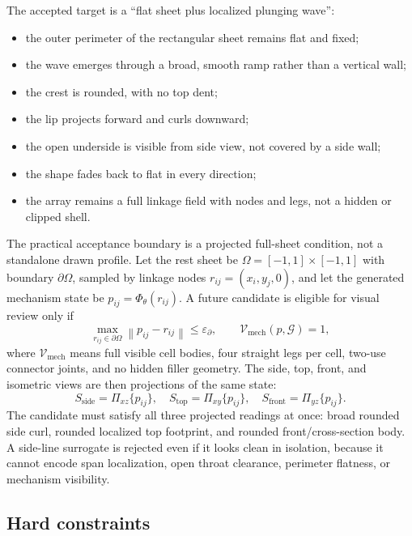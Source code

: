 \documentclass[12pt,letterpaper]{article}
\newcommand{\norm}[1]{\left\lVert #1 \right\rVert}
\begin{document}
The accepted target is a ``flat sheet plus localized plunging wave'':
\begin{itemize}
  \item the outer perimeter of the rectangular sheet remains flat and fixed;
  \item the wave emerges through a broad, smooth ramp rather than a vertical wall;
  \item the crest is rounded, with no top dent;
  \item the lip projects forward and curls downward;
  \item the open underside is visible from side view, not covered by a side wall;
  \item the shape fades back to flat in every direction;
  \item the array remains a full linkage field with nodes and legs, not a hidden or clipped shell.
\end{itemize}

The practical acceptance boundary is a projected full-sheet condition, not a standalone drawn profile. Let the rest sheet be \(\Omega=[-1,1]\times[-1,1]\) with boundary \(\partial\Omega\), sampled by linkage nodes \(r_{ij}=(x_i,y_j,0)\), and let the generated mechanism state be \(p_{ij}=\Phi_\theta(r_{ij})\). A future candidate is eligible for visual review only if
\[
  \max_{r_{ij}\in\partial\Omega}\norm{p_{ij}-r_{ij}}\le\varepsilon_{\partial},
  \qquad
  \mathcal{V}_{\mathrm{mech}}(p,\mathcal{G})=1,
\]
where \(\mathcal{V}_{\mathrm{mech}}\) means full visible cell bodies, four straight legs per cell, two-use connector joints, and no hidden filler geometry. The side, top, front, and isometric views are then projections of the same state:
\[
  S_{\mathrm{side}}=\Pi_{xz}\{p_{ij}\},\quad
  S_{\mathrm{top}}=\Pi_{xy}\{p_{ij}\},\quad
  S_{\mathrm{front}}=\Pi_{yz}\{p_{ij}\}.
\]
The candidate must satisfy all three projected readings at once: broad rounded side curl, rounded localized top footprint, and rounded front/cross-section body. A side-line surrogate is rejected even if it looks clean in isolation, because it cannot encode span localization, open throat clearance, perimeter flatness, or mechanism visibility.

\subsection{Hard constraints}
\end{document}

